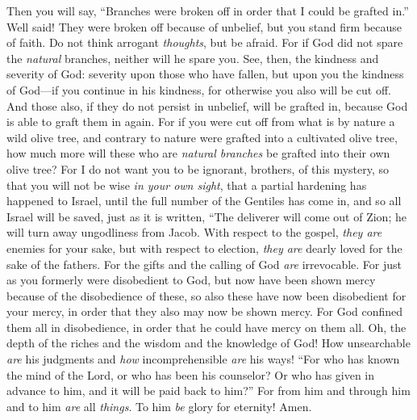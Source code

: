 \begin{biblechapter}
\verse Then you will say, “Branches were broken off in order that I could be grafted in.”
\verse Well said! They were broken off because of unbelief, but you stand firm because of faith. Do not think arrogant \textit{thoughts}, but be afraid.
\verse For if God did not spare the \textit{natural} branches, neither will he spare you.
\verse See, then, the kindness and severity of God: severity upon those who have fallen, but upon you the kindness of God—if you continue in his kindness, for otherwise you also will be cut off.
\verse And those also, if they do not persist in unbelief, will be grafted in, because God is able to graft them in again.
\verse For if you were cut off from what is by nature a wild olive tree, and contrary to nature were grafted into a cultivated olive tree, how much more will these who are \textit{natural branches} be grafted into their own olive tree?
 For I do not want you to be ignorant, brothers, of this mystery, so that you will not be wise \textit{in your own sight}, that a partial hardening has happened to Israel, until the full number of the Gentiles has come in,
\verse and so all Israel will be saved, just as it is written,
\verse “The deliverer will come out of Zion; 
he will turn away ungodliness from Jacob.
\verse With respect to the gospel, \textit{they are} enemies for your sake, but with respect to election, \textit{they are} dearly loved for the sake of the fathers.
\verse For the gifts and the calling of God \textit{are} irrevocable.
\verse For just as you formerly were disobedient to God, but now have been shown mercy because of the disobedience of these,
\verse so also these have now been disobedient for your mercy, in order that they also may now be shown mercy.
\verse For God confined them all in disobedience, in order that he could have mercy on them all.
\verse Oh, the depth of the riches 
and the wisdom and the knowledge of God! 
How unsearchable \textit{are} his judgments 
and \textit{how} incomprehensible \textit{are} his ways!
\verse “For who has known the mind of the Lord, 
or who has been his counselor?
\verse Or who has given in advance to him, 
and it will be paid back to him?”
\verse For from him and through him and to him \textit{are} all \textit{things}. 
To him \textit{be} glory for eternity! Amen.
\end{biblechapter}

